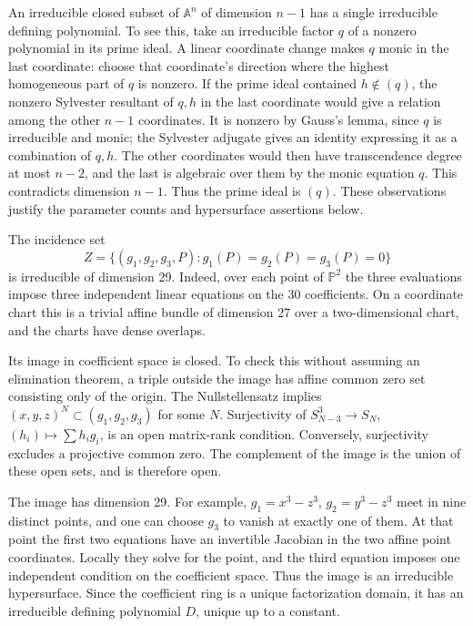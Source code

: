 \documentclass[
]{article}
\begin{document}
An irreducible closed subset of \(\mathbb A^n\) of dimension \(n-1\) has
a single irreducible defining polynomial. To see this, take an
irreducible factor \(q\) of a nonzero polynomial in its prime ideal. A
linear coordinate change makes \(q\) monic in the last coordinate:
choose that coordinate's direction where the highest homogeneous part of
\(q\) is nonzero. If the prime ideal contained \(h\notin(q)\), the
nonzero Sylvester resultant of \(q,h\) in the last coordinate would give
a relation among the other \(n-1\) coordinates. It is nonzero by Gauss's
lemma, since \(q\) is irreducible and monic; the Sylvester adjugate
gives an identity expressing it as a combination of \(q,h\). The other
coordinates would then have transcendence degree at most \(n-2\), and
the last is algebraic over them by the monic equation \(q\). This
contradicts dimension \(n-1\). Thus the prime ideal is \((q)\). These
observations justify the parameter counts and hypersurface assertions
below.

The incidence set \[
Z=\{(g_1,g_2,g_3,P):g_1(P)=g_2(P)=g_3(P)=0\}
\] is irreducible of dimension 29. Indeed, over each point of
\(\mathbb P^2\) the three evaluations impose three independent linear
equations on the 30 coefficients. On a coordinate chart this is a
trivial affine bundle of dimension 27 over a two-dimensional chart, and
the charts have dense overlaps.

Its image in coefficient space is closed. To check this without assuming
an elimination theorem, a triple outside the image has affine common
zero set consisting only of the origin. The Nullstellensatz implies
\((x,y,z)^N\subset(g_1,g_2,g_3)\) for some \(N\). Surjectivity of
\(S_{N-3}^3\to S_N\), \((h_i)\mapsto\sum h_ig_i\), is an open
matrix-rank condition. Conversely, surjectivity excludes a projective
common zero. The complement of the image is the union of these open
sets, and is therefore open.

The image has dimension 29. For example, \(g_1=x^3-z^3\),
\(g_2=y^3-z^3\) meet in nine distinct points, and one can choose \(g_3\)
to vanish at exactly one of them. At that point the first two equations
have an invertible Jacobian in the two affine point coordinates. Locally
they solve for the point, and the third equation imposes one independent
condition on the coefficient space. Thus the image is an irreducible
hypersurface. Since the coefficient ring is a unique factorization
domain, it has an irreducible defining polynomial \(D\), unique up to a
constant.
\end{document}
